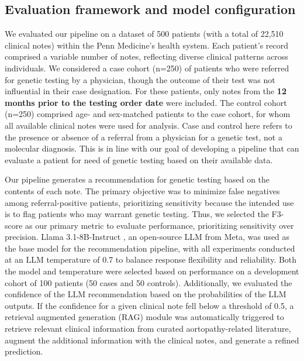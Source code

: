 \documentclass[fleqn,10pt]{wlscirep}
\begin{document}
\subsection*{Evaluation framework and model configuration}
We evaluated our pipeline on a dataset of 500 patients (with a total of 22,510 clinical notes) within the Penn Medicine's health system. Each patient’s record comprised a variable number of notes, reflecting diverse clinical patterns across individuals. We considered a case cohort (n=250) of patients who were referred for genetic testing by a physician, though the outcome of their test was not influential in their case designation. For these patients, only notes from the \textbf{12 months prior to the testing order date} were included. The control cohort (n=250) comprised age- and sex-matched patients to the case cohort, for whom all available clinical notes were used for analysis. Case and control here refers to the presence or absence of a referral from a physician for a genetic test, not a molecular diagnosis. This is in line with our goal of developing a pipeline that can evaluate a patient for need of genetic testing based on their available data.

Our pipeline generates a recommendation for genetic testing based on the contents of each note. The primary objective was to minimize false negatives among referral-positive patients, prioritizing sensitivity because the intended use is to flag patients who may warrant genetic testing. Thus, we selected the F3-score as our primary metric to evaluate performance, prioritizing sensitivity over precision. Llama 3.1-8B-Instruct \cite{grattafiori2024llama}, an open-source LLM from Meta, was used as the base model for the recommendation pipeline, with all experiments conducted at an LLM temperature of 0.7 to balance response flexibility and reliability. Both the model and temperature were selected based on performance on a development cohort of 100 patients (50 cases and 50 controls). Additionally, we evaluated the confidence of the LLM recommendation based on the probabilities of the LLM outputs. If the confidence for a given clinical note fell below a threshold of 0.5, a retrieval augmented generation (RAG) \cite{lewis2020retrieval} module was automatically triggered to retrieve relevant clinical information from curated aortopathy-related literature, augment the additional information with the clinical notes, and generate a refined prediction.
\end{document}
